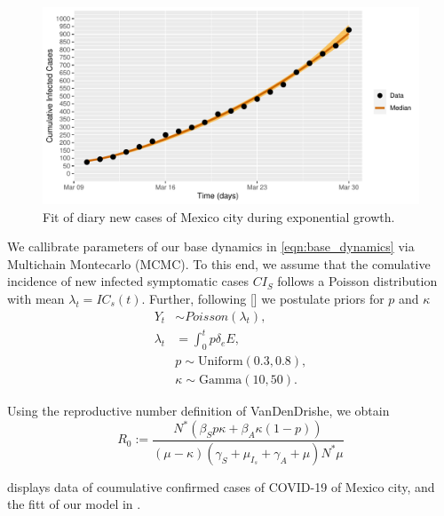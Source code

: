 %
\begin{figure}[htb]
	\centering
   	\includegraphics[scale=0.8, keepaspectratio]{./cdmx_CIs_data_begining_fit}
   	\caption{%
   		Fit of diary new cases of Mexico city
   		during exponential growth.
   	}
    \label{fig:data_CDMX_fitting}
\end{figure}
%

        We callibrate parameters of our base dynamics in
    \eqref{eqn:base_dynamics} via Multichain Montecarlo (MCMC).
    To this end, we assume that the comulative
    incidence of new infected symptomatic cases $CI_S$
    follows a Poisson distribution with mean $\lambda_t = IC_s(t)$. Further,
    following [] we postulate priors for $p$ and $\kappa$
    \begin{equation}
        \label{eqn:boservation_model}
        \begin{aligned}
            Y_t & \sim Poisson(\lambda_t),
    		\\
    		\lambda_t
    			&=
    			\int_{0}^t p \delta_e E ,
    		\\
    			& p \sim \text{Uniform} (0.3, 0.8),
    		\\
    			& \kappa \sim \text{Gamma}(10, 50).
    	\end{aligned}
    \end{equation}

	Using the reproductive number definition of VanDenDrishe, we obtain
\begin{equation*}
	\label{eqn:reproductive_number}
	R_0 :=
		\frac{
			N^{*}(
				\beta_S p
				\kappa +
				\beta_A
				\kappa(1-p) )
		}{
			(\mu - \kappa)( \gamma_S + \mu_{I_s} + \gamma_A + \mu)
			N^* \mu
		}
\end{equation*}

     displays data of coumulative confirmed cases
of COVID-19 of Mexico city, and the fitt of our model in
.
